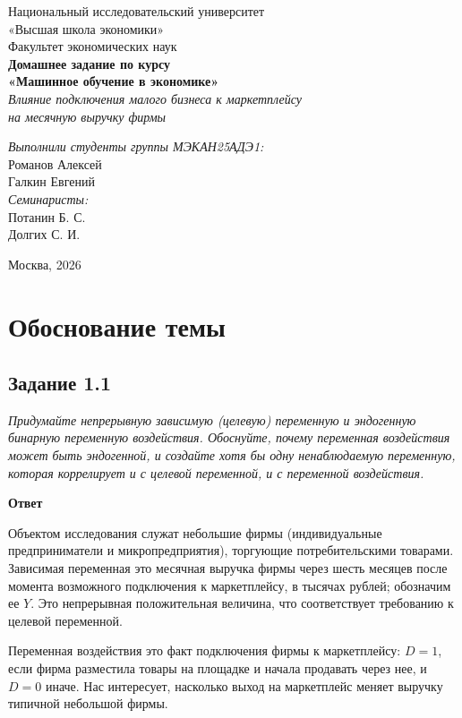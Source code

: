 \documentclass[12pt,a4paper]{article}
\newcommand{\zadanie}[2]{\subsection*{Задание #1}\begingroup\itshape #2\par\endgroup\medskip}
\newcommand{\otvet}{\par\noindent\textbf{Ответ}\par\medskip}
\begin{document}
\begin{titlepage}
\centering
\vspace*{1.5cm}
{\large Национальный исследовательский университет\\ «Высшая школа экономики»}\\[0.3cm]
{\large Факультет экономических наук}\\[3cm]
{\Large\bfseries Домашнее задание по курсу}\\[0.3cm]
{\Large\bfseries «Машинное обучение в экономике»}\\[1cm]
{\large\itshape Влияние подключения малого бизнеса к маркетплейсу\\ на месячную выручку фирмы}\\[3cm]
\begin{flushright}\large
\textit{Выполнили студенты группы МЭКАН25АДЭ1:}\\[0.2cm]
Романов Алексей\\ Галкин Евгений\\[1cm]
\textit{Семинаристы:}\\ Потанин Б. С.\\ Долгих С. И.\\
\end{flushright}
\vfill {\large Москва, 2026}
\end{titlepage}

\tableofcontents
\newpage

\section{Обоснование темы}

\zadanie{1.1}{Придумайте непрерывную зависимую (целевую) переменную и эндогенную бинарную переменную воздействия. Обоснуйте, почему переменная воздействия может быть эндогенной, и создайте хотя бы одну ненаблюдаемую переменную, которая коррелирует и с целевой переменной, и с переменной воздействия.}
\otvet
Объектом исследования служат небольшие фирмы (индивидуальные предприниматели и микропредприятия), торгующие потребительскими товарами. Зависимая переменная это месячная выручка фирмы через шесть месяцев после момента возможного подключения к маркетплейсу, в тысячах рублей; обозначим ее $Y$. Это непрерывная положительная величина, что соответствует требованию к целевой переменной.

Переменная воздействия это факт подключения фирмы к маркетплейсу: $D=1$, если фирма разместила товары на площадке и начала продавать через нее, и $D=0$ иначе. Нас интересует, насколько выход на маркетплейс меняет выручку типичной небольшой фирмы.
\end{document}
